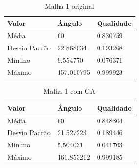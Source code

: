 \documentclass[review]{elsarticle}
\begin{document}
\begin{table}[hb]
    \caption{Malha 1 original}
    \centering
    \begin{tabular}{lll}
    \toprule
    Valor & Ângulo & Qualidade \\
    \midrule
    Média & 60 & 0.830759 \\
    Desvio Padrão & 22.868034 & 0.193268 \\
    Mínimo & 9.554770 & 0.076371 \\
    Máximo & 157.010795 & 0.999923
    \end{tabular}
    \label{tb:malha-1-original}
\end{table}

\begin{table}[]
    \caption{Malha 1 com GA}
    \centering
    \begin{tabular}{lll}
    \toprule
    Valor & Ângulo & Qualidade \\
    \midrule
    Média & 60 & 0.848804 \\
    Desvio Padrão & 21.527223 & 0.189446 \\
    Mínimo & 5.504031 & 0.041763 \\
    Máximo & 161.853212 & 0.999185
    \end{tabular}
    \label{tb:malha-1-ga}
\end{table}
\end{document}
